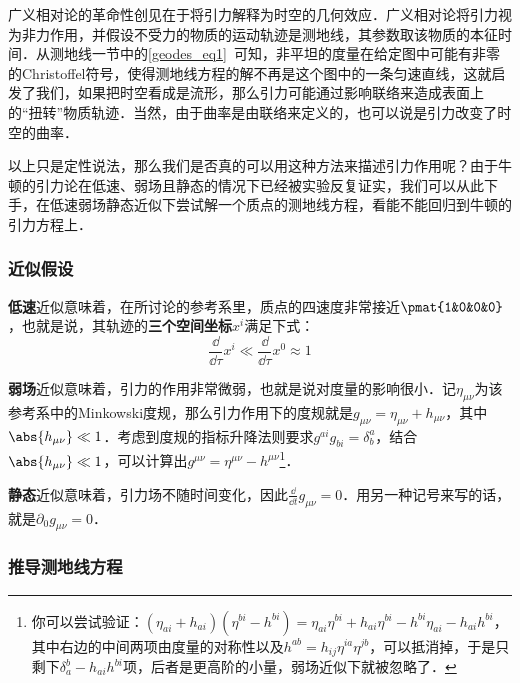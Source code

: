 

广义相对论的革命性创见在于将引力解释为时空的几何效应．广义相对论将引力视为非力作用，并假设不受力的物质的运动轨迹是测地线，其参数取该物质的本征时间．从测地线一节中的\autoref{geodes_eq1}~可知，非平坦的度量在给定图中可能有非零的Christoffel符号，使得测地线方程的解不再是这个图中的一条匀速直线，这就启发了我们，如果把时空看成是流形，那么引力可能通过影响联络来造成表面上的“扭转”物质轨迹．当然，由于曲率是由联络来定义的，也可以说是引力改变了时空的曲率．

以上只是定性说法，那么我们是否真的可以用这种方法来描述引力作用呢？由于牛顿的引力论在低速、弱场且静态的情况下已经被实验反复证实，我们可以从此下手，在低速弱场静态近似下尝试解一个质点的测地线方程，看能不能回归到牛顿的引力方程上．

\subsubsection{近似假设}

\textbf{低速}近似意味着，在所讨论的参考系里，质点的四速度非常接近$\pmat{1&0&0&0}$，也就是说，其轨迹的\textbf{三个空间坐标}$x^i$满足下式：
\begin{equation}\label{WeakG_eq1}
\frac{\dd}{\dd \tau}x^i\ll \frac{\dd}{\dd \tau}x^0\approx 1
\end{equation}

\textbf{弱场}近似意味着，引力的作用非常微弱，也就是说对度量的影响很小．记$\eta_{\mu\nu}$为该参考系中的Minkowski度规，那么引力作用下的度规就是$g_{\mu\nu}=\eta_{\mu\nu}+h_{\mu\nu}$，其中$\abs{h_{\mu\nu}}\ll 1$．考虑到度规的指标升降法则要求$g^{ai}g_{bi}=\delta^a_b$，结合$\abs{h_{\mu\nu}}\ll 1$，可以计算出$g^{\mu\nu}=\eta^{\mu\nu}-h^{\mu\nu}$\footnote{你可以尝试验证：$(\eta_{ai}+h_{ai})(\eta^{bi}-h^{bi})=\eta_{ai}\eta^{bi}+h_{ai}\eta^{bi}-h^{bi}\eta_{ai}-h_{ai}h^{bi}$，其中右边的中间两项由度量的对称性以及$h^{ab}=h_{ij}\eta^{ia}\eta^{jb}$，可以抵消掉，于是只剩下$\delta^b_a-h_{ai}h^{bi}$项，后者是更高阶的小量，弱场近似下就被忽略了．}．

\textbf{静态}近似意味着，引力场不随时间变化，因此$\frac{\dd}{\dd t}g_{\mu\nu}=0$．用另一种记号来写的话，就是$\partial_0g_{\mu\nu}=0$．

\subsubsection{推导测地线方程}

